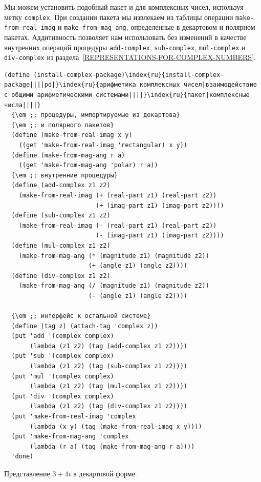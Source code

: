 Мы можем установить подобный пакет и для комплексных
чисел, используя метку {\tt complex}.
При создании пакета мы
извлекаем из таблицы операции {\tt make-from-real-imag} и
{\tt make-from-mag-ang}, определенные в декартовом и
полярном пакетах.  Аддитивность позволяет нам 
использовать без изменений в качестве внутренних операций процедуры
{\tt add-complex}, {\tt sub-complex},
{\tt mul-complex} и {\tt div-complex} из 
раздела~\ref{REPRESENTATIONS-FOR-COMPLEX-NUMBERS}.


\begin{Verbatim}[fontsize=\small]
(define (install-complex-package)\index{ru}{install-complex-package||||pd|}\index{ru}{арифметика комплексных чисел|взаимодействие c общими арифметическими системами||||}\index{ru}{пакет|комплексные числа||||}
  {\em ;; процедуры, импортируемые из декартова}
  {\em ;; и полярного пакетов}
  (define (make-from-real-imag x y)
    ((get 'make-from-real-imag 'rectangular) x y))
  (define (make-from-mag-ang r a)
    ((get 'make-from-mag-ang 'polar) r a))
  {\em ;; внутренние процедуры}
  (define (add-complex z1 z2)
    (make-from-real-imag (+ (real-part z1) (real-part z2))
                         (+ (imag-part z1) (imag-part z2))))
  (define (sub-complex z1 z2)
    (make-from-real-imag (- (real-part z1) (real-part z2))
                         (- (imag-part z1) (imag-part z2))))
  (define (mul-complex z1 z2)
    (make-from-mag-ang (* (magnitude z1) (magnitude z2))
                       (+ (angle z1) (angle z2))))
  (define (div-complex z1 z2)
    (make-from-mag-ang (/ (magnitude z1) (magnitude z2))
                       (- (angle z1) (angle z2))))

  {\em ;; интерфейс к остальной системе}
  (define (tag z) (attach-tag 'complex z))
  (put 'add '(complex complex)
       (lambda (z1 z2) (tag (add-complex z1 z2))))
  (put 'sub '(complex complex)
       (lambda (z1 z2) (tag (sub-complex z1 z2))))
  (put 'mul '(complex complex)
       (lambda (z1 z2) (tag (mul-complex z1 z2))))
  (put 'div '(complex complex)
       (lambda (z1 z2) (tag (div-complex z1 z2))))
  (put 'make-from-real-imag 'complex
       (lambda (x y) (tag (make-from-real-imag x y))))
  (put 'make-from-mag-ang 'complex
       (lambda (r a) (tag (make-from-mag-ang r a))))
  'done)
\end{Verbatim}


\begin{cntrfig}

\caption{Представление $3+4i$
в декартовой форме.}
\label{F2.24}

\end{cntrfig}

